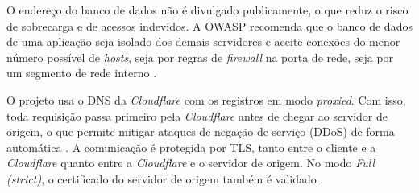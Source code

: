 O endereço do banco de dados não é divulgado publicamente, o que reduz o risco de sobrecarga e de acessos indevidos. A OWASP recomenda que o banco de dados de uma aplicação seja isolado dos demais servidores e aceite conexões do menor número possível de \textit{hosts}, seja por regras de \textit{firewall} na porta de rede, seja por um segmento de rede interno \cite{owasp-database}.

O projeto usa o DNS da \textit{Cloudflare} com os registros em modo \textit{proxied}. Com isso, toda requisição passa primeiro pela \textit{Cloudflare} antes de chegar ao servidor de origem, o que permite mitigar ataques de negação de serviço (DDoS) de forma automática \cite{cloudflare-ddos}. A comunicação é protegida por TLS, tanto entre o cliente e a \textit{Cloudflare} quanto entre a \textit{Cloudflare} e o servidor de origem. No modo \textit{Full (strict)}, o certificado do servidor de origem também é validado \cite{cloudflare_full_strict}.
